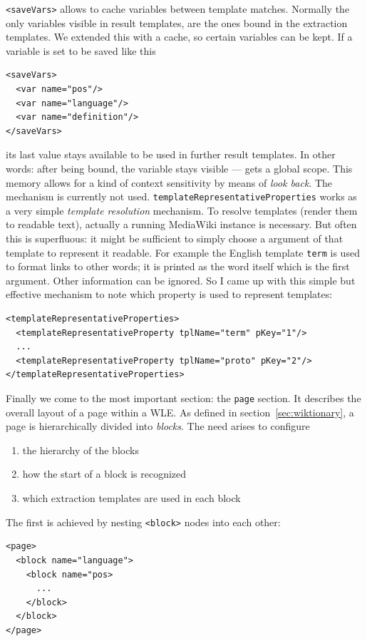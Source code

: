 \texttt{<saveVars>} allows to cache variables between template matches. 
Normally the only variables visible in result templates, are the ones bound in the extraction templates. 
We extended this with a cache, so certain variables can be kept. 
If a variable is set to be saved like this
\begin{lstlisting}[style=XML]
<saveVars>
  <var name="pos"/>
  <var name="language"/>
  <var name="definition"/>
</saveVars>
\end{lstlisting}
its last value stays available to be used in further result templates. In other words: after being bound, the variable stays visible --- gets a global scope. 
This memory allows for a kind of context sensitivity by means of \textit{look back}. 
The mechanism is currently not used.\newline
\texttt{templateRepresentativeProperties} works as a very simple \textit{template resolution} mechanism. 
To resolve templates (render them to readable text), actually a running MediaWiki instance is necessary. 
But often this is superfluous: it might be sufficient to simply choose a argument of that template to represent it readable. 
For example the English template \texttt{term} is used to format links to other words; it is printed as the word itself which is the first argument. 
Other information can be ignored. 
So I came up with this simple but effective mechanism to note which property is used to represent templates:
\begin{lstlisting}[style=XML]
<templateRepresentativeProperties>
  <templateRepresentativeProperty tplName="term" pKey="1"/>
  ...
  <templateRepresentativeProperty tplName="proto" pKey="2"/>
</templateRepresentativeProperties>
\end{lstlisting}

Finally we come to the most important section: the \texttt{page} section. 
It describes the overall layout of a page within a WLE.
As defined in section~\ref{sec:wiktionary}, a page is hierarchically divided into \textit{blocks}. 
The need arises to configure
\begin{enumerate}
\item the hierarchy of the blocks
\item how the start of a block is recognized
\item which extraction templates are used in each block
\end{enumerate}

The first is achieved by nesting \texttt{<block>} nodes into each other:
\begin{lstlisting}[style=XML]
<page>
  <block name="language">
    <block name="pos>
      ...
    </block>
  </block>
</page>
\end{lstlisting}

